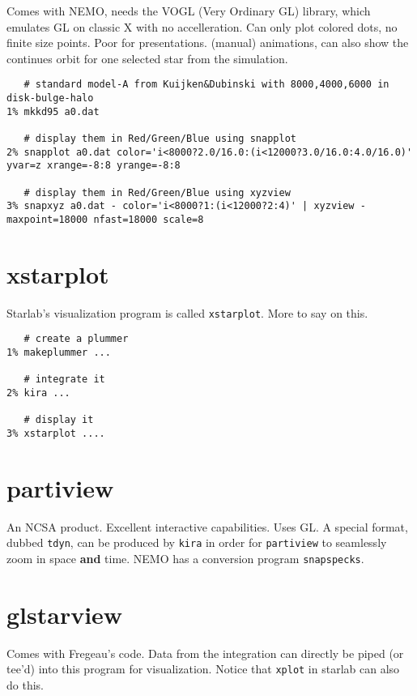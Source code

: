 Comes with NEMO, needs the VOGL (Very Ordinary GL) library, which emulates
GL on classic X with no accelleration. Can only plot colored dots, no finite
size points. Poor for presentations. (manual) animations, can also show
the continues orbit for one selected star from the simulation. 


\footnotesize\begin{verbatim}
   # standard model-A from Kuijken&Dubinski with 8000,4000,6000 in disk-bulge-halo
1% mkkd95 a0.dat

   # display them in Red/Green/Blue using snapplot 
2% snapplot a0.dat color='i<8000?2.0/16.0:(i<12000?3.0/16.0:4.0/16.0)' yvar=z xrange=-8:8 yrange=-8:8

   # display them in Red/Green/Blue using xyzview
3% snapxyz a0.dat - color='i<8000?1:(i<12000?2:4)' | xyzview - maxpoint=18000 nfast=18000 scale=8
\end{verbatim}\normalsize


\section{xstarplot}

Starlab's visualization program is called {\tt xstarplot}. More to say on this.

\footnotesize\begin{verbatim}
   # create a plummer
1% makeplummer ...

   # integrate it
2% kira ...

   # display it
3% xstarplot ....
\end{verbatim}\normalsize

\section{partiview}

An NCSA product. Excellent interactive capabilities. Uses GL. A special
format, dubbed {\tt tdyn}, can be produced by {\tt kira} in order for
{\tt partiview} to seamlessly zoom in space {\bf and} time. NEMO has
a conversion program {\tt snapspecks}.

\section{glstarview}

Comes with Fregeau's code. Data from the integration can directly be piped
(or tee'd) into this program for visualization. Notice that {\tt xplot}
in starlab can also do this.

